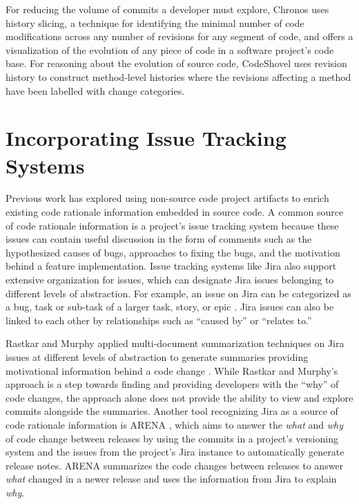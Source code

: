 For reducing the volume of commits a developer must explore, Chronos \cite{servant_history_2012} uses history slicing, a technique for identifying the minimal number of code modifications across any number of revisions for any segment of code, and offers a visualization of the evolution of any piece of code in a software project's code base.
For reasoning about the evolution of source code, CodeShovel \cite{grund_codeshovel_2021} uses revision history to construct method-level histories where the revisions affecting a method have been labelled with change categories.

\section{Incorporating Issue Tracking Systems}

Previous work has explored using non-source code project artifacts to enrich existing code rationale information embedded in source code. 
A common source of code rationale information is a project's issue tracking system because these issues can contain useful discussion in the form of comments such as the hypothesized causes of bugs, approaches to fixing the bugs, and the motivation behind a feature implementation. 
Issue tracking systems like Jira also support extensive organization for issues, which can designate Jira issues belonging to different levels of abstraction.
For example, an issue on Jira can be categorized as a bug, task or sub-task of a larger task, story, or epic \cite{jira-issue-types}.
Jira issues can also be linked to each other by relationships such as ``caused by'' or ``relates to.''

Rastkar and Murphy applied multi-document summarization techniques on Jira issues at different levels of abstraction to generate summaries providing motivational information behind a code change \cite{rastkar_why_2013}.
While Rastkar and Murphy's approach is a step towards finding and providing developers with the ``why'' of code changes, the approach alone does not provide the ability to view and explore commits alongside the summaries.
Another tool recognizing Jira as a source of code rationale information is ARENA \cite{moreno_arena_2017}, which aims to answer the \emph{what} and \emph{why} of code change between releases by using the commits in a project's versioning system and the issues from the project's Jira instance to automatically generate release notes. 
ARENA summarizes the code changes between releases to answer \emph{what} changed in a newer release and uses the information from Jira to explain \emph{why}.

